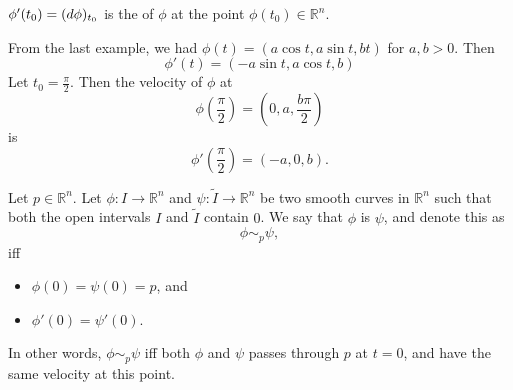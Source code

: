 \documentclass[notoc,notitlepage]{tufte-book}
\begin{document}
\begin{note}
  $\phi'(t_0) = (\mathop{}\!d{\phi})_{t_0}$ is the 
  of $\phi$ at the point $\phi(t_0) \in \mathbb{R}^n$.
\end{note}

\begin{eg}
  From the last example, we had $\phi(t) = (a \cos t, a \sin t, bt)$ for $a, b > 0$.
  Then
  \begin{equation*}
    \phi'(t) = (-a \sin t, a \cos t, b)
  \end{equation*}
  Let $t_0 = \frac{\pi}{2}$. Then the velocity of $\phi$ at
  \begin{equation*}
    \phi \left( \frac{\pi}{2} \right) = (0, a, \frac{b \pi}{2})
  \end{equation*}
  is
  \begin{equation*}
    \phi'\left(\frac{\pi}{2}\right) = (-a, 0, b).
  \end{equation*}
\end{eg}

\begin{defn}\label{defn:equivalent_curves}
  Let $p \in \mathbb{R}^n$. Let $\phi : I \to \mathbb{R}^n$ and
  $\psi : \tilde{I} \to \mathbb{R}^n$ be two smooth curves in $\mathbb{R}^n$ such
  that both the open intervals $I$ and $\tilde{I}$ contain $0$. We say that
  $\phi$ is  $\psi$, and denote this as
  \begin{equation*}
    \phi \sim_{p} \psi,
  \end{equation*}
  iff
  \begin{itemize}
    \item $\phi(0) = \psi(0) = p$, and
    \item $\phi'(0) = \psi'(0)$.
  \end{itemize}
\end{defn}

\begin{note}
  In other words, $\phi \sim_p \psi$ iff both $\phi$ and $\psi$ passes through
  $p$ at $t = 0$, and have the same velocity at this point.
\end{note}
\end{document}
